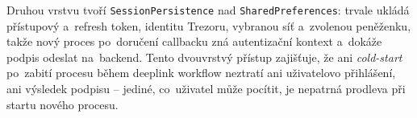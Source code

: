 Druhou vrstvu tvoří \texttt{Session\allowbreak Persistence} nad
\texttt{SharedPreferences}: trvale ukládá přístupový a~refresh token,
identitu Trezoru, vybranou síť a~zvolenou peněženku, takže nový
proces po~doručení callbacku zná autentizační kontext a~dokáže
podpis odeslat na~backend. Tento dvouvrstvý přístup zajišťuje, že
ani \emph{cold-start} po~zabití procesu během deeplink workflow
neztratí ani uživatelovo přihlášení, ani výsledek podpisu --
jediné, co~uživatel může pocítit, je nepatrná prodleva při startu
nového procesu.
